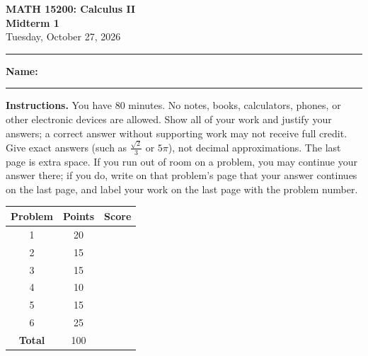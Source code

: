 \documentclass[12pt,letterpaper]{article}
\newif\ifsolutions
\begin{document}
\thispagestyle{empty}

\begin{center}
  {\large\bfseries MATH 15200: Calculus II}\\
  {\large\bfseries Midterm 1}\\[0.3em]
  Tuesday, October 27, 2026
\end{center}

\vspace{0.25em}
\hrule
\vspace{1.5em}

\textbf{Name:} \rule{4in}{0.4pt}

\ifsolutions
  \begin{center}
    {\color{blue!55!black}\large\bfseries ANSWER KEY}
  \end{center}
\fi

\vspace{0.8em}

\textbf{Instructions.} You have 80 minutes. No notes, books, calculators,
phones, or other electronic devices are allowed. Show all of your work and
justify your answers; a correct answer without supporting work may not receive
full credit. Give exact answers (such as $\tfrac{\sqrt{2}}{3}$ or $5\pi$), not
decimal approximations. The last page is extra space. If you run out of room
on a problem, you may continue your answer there; if you do, write on that
problem's page that your answer continues on the last page, and label your
work on the last page with the problem number.

\vfill

\begin{center}
  \renewcommand{\arraystretch}{1.5}
  \begin{tabular}{|c|c|p{1in}|}
    \hline
    \textbf{Problem} & \textbf{Points} & \textbf{Score} \\
    \hline
    1 & 20 & \\ \hline
    2 & 15 & \\ \hline
    3 & 15 & \\ \hline
    4 & 10 & \\ \hline
    5 & 15 & \\ \hline
    6 & 25 & \\ \hline
    \textbf{Total} & 100 & \\ \hline
  \end{tabular}
\end{center}

\vfill
\newpage
\end{document}
